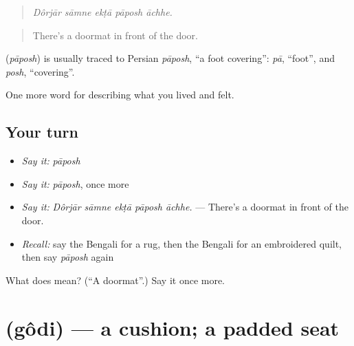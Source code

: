 \begin{quote}
    
\end{quote}

\begin{quote}
\emph{Dôrjār sāmne ekṭā pāposh āchhe.}
\end{quote}

\begin{quote}
There's a doormat in front of the door.
\end{quote}

\begin{cousinweb}
\textbf{} (\emph{pāposh}) is usually traced to Persian \emph{pāposh}, \textquotedblleft{}a foot covering\textquotedblright{}: \emph{pā}, \textquotedblleft{}foot\textquotedblright{}, and \emph{posh}, \textquotedblleft{}covering\textquotedblright{}.
\end{cousinweb}

\begin{grammarlens}[title={What you've built}]
One more word for describing what you lived and felt.
\end{grammarlens}

\subsection*{Your turn}
\begin{itemize}
\raggedright
  \item \emph{Say it:} \emph{pāposh}
  \item \emph{Say it:} \emph{pāposh}, once more
  \item \emph{Say it:} \emph{Dôrjār sāmne ekṭā pāposh āchhe.} — There's a doormat in front of the door.
  \item \emph{Recall:} say the Bengali for a rug, then the Bengali for an embroidered quilt, then say \emph{pāposh} again
\end{itemize}

\begin{tcolorbox}[breakable,colback=teal!4,colframe=teal!35!black,title={Before you move on}]
What does  mean? (\textquotedblleft{}A doormat\textquotedblright{}.) Say it once more.
\end{tcolorbox}
\section[\texorpdfstring{\bn{গদি} (gôdi)}{গদি (gôdi)}]{ (gôdi) — a cushion; a padded seat}

